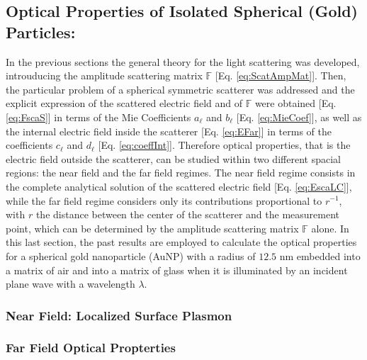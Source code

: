 \documentclass[11pt]{Latex/Classes/PhDthesisPSnPDF}
\begin{document}
        \subsection{Optical Properties of Isolated Spherical (Gold) Particles:}
		 \label{ss:AuMie}

         In the previous sections the general theory for the light scattering was developed, introuducing the amplitude scattering matrix $\mathbb{F}$ [Eq. \eqref{eq:ScatAmpMat}]. Then, the particular problem of a spherical symmetric scatterer was addressed and the explicit expression of the scattered electric field and of $\mathbb{F}$ were obtained [Eq. \eqref{eq:FscaS}] in terms of the Mie Coefficients $a_\ell$ and  $b_\ell$ [Eq. \eqref{eq:MieCoef}], as well as the internal electric field inside the scatterer [Eq. \eqref{eq:EFar}] in terms of the coefficients $c_\ell$ and $d_\ell$ [Eq. \eqref{eq:coeffInt}]. Therefore optical properties, that is the electric field outside the scatterer, can be studied within two different spacial regions: the near field and the far field regimes. The near field regime consists in the complete analytical solution of the scattered electric field [Eq. \eqref{eq:EscaLC}], while the far field regime considers only its contributions proportional to $r^{-1}$, with $r$ the distance between the center of the scatterer and the measurement point, which can be determined by the amplitude scattering matrix $\mathbb{F}$ alone.  In this last section, the past results are employed to calculate the optical properties for a spherical gold nanoparticle (AuNP) with a radius of $12.5$ nm embedded into a matrix of air and into a matrix of glass when it is illuminated by an incident plane wave with a wavelength $\lambda$.

            \subsubsection{Near Field: Localized Surface Plasmon}
             \label{sss:LSPR}
             

            \subsubsection{Far Field Optical Propterties}
             \label{sss:FarField}
             

\end{document}
